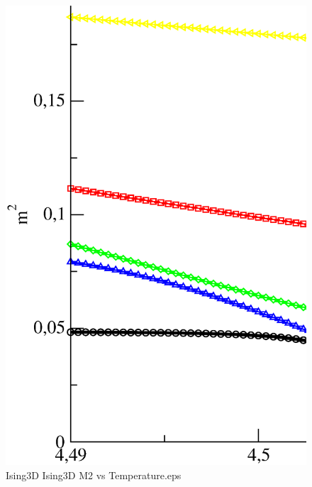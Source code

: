 \begin{figure}[!htpb]
  \centering
  \includegraphics[width=\textwidth]{./plots/Ising3D/Ising3D_M2_vs_Temperature.eps}
  \caption{Ising3D Ising3D M2 vs Temperature.eps}
\end{figure}

